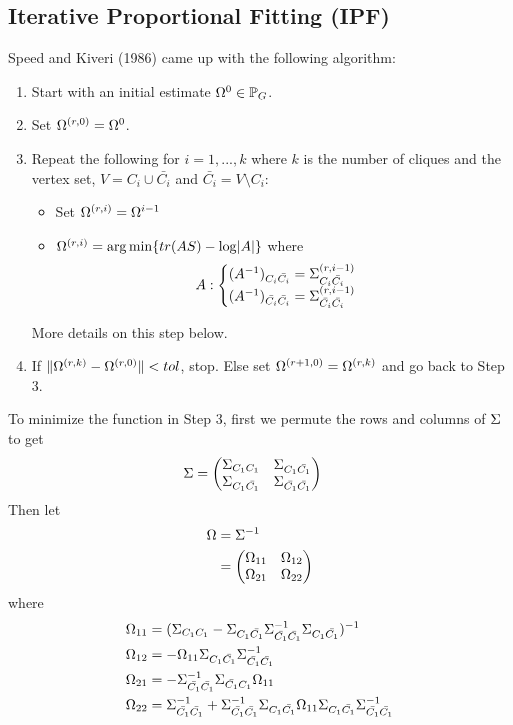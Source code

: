 \documentclass[12pt, leqno]{article}
\providecommand{\abs}[1]{\lvert#1\rvert}
\providecommand{\norm}[1]{\lVert#1\rVert}
\def\s{\ensuremath\Sigma}
\def\om{\ensuremath\Omega}
\def\pg{\ensuremath\mathbb{P}_{{G}}}
\begin{document}
\subsection{Iterative Proportional Fitting (IPF)} \label{ssc:ipf} Speed and Kiveri
(1986) came up with the following algorithm:
\begin{enumerate}
\item Start with an initial estimate $\om^{0} \in \pg$.
\item Set $\om^{(r,0)} = \om^{0}$.
\item Repeat the following for $i = 1, ..., k$ where $k$ is the number
  of cliques and the vertex set,
  $V = C_i \cup \bar{C_i}$ and $\bar{C_i} = V \setminus C_i$:
\begin{itemize}
\item Set $\om^{(r,i)} = \om^{i-1}$
\item $\om^{(r,i)} =  \arg\min \{ tr(AS) - \log \abs{A} \}$
where
\[
A: 
\begin{cases} (A^{-1})_{C_i \bar{C_i}} = \s_{C_i \bar{C_i}}^{(r,i-1)} \\
(A^{-1})_{\bar{C_i} \bar{C_i}} = \s_{\bar{C_i} \bar{C_i}}^{(r,i-1)}
\end{cases} 
\]
\end{itemize}
More details on this step below.
\item If $\norm{\om^{(r,k)} - \om^{(r,0)}} < tol$, stop. Else set
  $\om^{(r+1,0)} = \om^{(r,k)}$ and go back to Step 3.
\end{enumerate}
To minimize the function in Step 3, first we permute the rows and columns of $\s$ to get 
\begin{align*}
\s &= 
\begin{pmatrix} 
\s_{C_1 C_1} & \s_{C_1 \bar{C_1}} \\
\s_{{C_1 \bar{C_1}}} & \s_{\bar{C_1} \bar{C_1}}  
\end{pmatrix}
\end{align*} 
Then let 
\begin{align*}
\om &= \s^{-1} \\
&= \begin{pmatrix} 
\om_{11} & \om_{12}\\
\om_{21} & \om_{22}
\end{pmatrix}
\end{align*} 
where 
\begin{align*}
\om_{11} &= (\s_{C_1 C_1} - \s_{C_1 \bar{C_1}} \s_{\bar{C_1}
  \bar{C_1}}^{-1} \s_{{C_1 \bar{C_1}}})^{-1} \\
\om_{12} &= - \om_{11} \s_{C_1 \bar{C_1}} \s_{\bar{C_1}
  \bar{C_1}}^{-1} \\
\om_{21} &= - \s_{\bar{C_1}
  \bar{C_1}}^{-1} \s_{ \bar{C_1} C_1} \om_{11} \\
\om_{22} &= \s_{\bar{C_1}
  \bar{C_1}}^{-1} + \s_{\bar{C_1}
  \bar{C_1}}^{-1} \s_{C_1 \bar{C_1}}  \om_{11} \s_{{C_1
           \bar{C_1}}} \s_{\bar{C_1}
  \bar{C_1}}^{-1} 
\end{align*}
\end{document}
